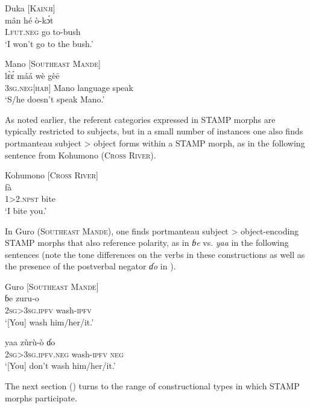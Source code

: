 \documentclass[output=paper]{langsci/langscibook}
\begin{document}
\ea\label{ex:anderson:6}
Duka  \citep[13]{BendorSamuelEtAl1973}      [\textsc{Kainji}]\\
\gll mân  hé  ò-k\'ɔt  \\
\textsc{I.fut.neg}  go  to-bush\\
\glt `I won't go to the bush.'      
\z

\ea\label{ex:anderson:7}
Mano \citep[226]{Vydrine2009}           [\textsc{Southeast Mande}]\\
\gll l\`{ɛ}\'{ɛ}      máá    wè    gè\={e}\\
\textsc{3sg.neg[hab]}  Mano    language  speak\\
\glt `S/he doesn't speak Mano.'
\z

As noted earlier, the referent categories expressed in STAMP morphs are typically restricted to subjects, but in a small number of instances one also finds portmanteau subject > object forms within a STAMP morph, as in the following sentence from Kohumono (\textsc{Cross River}).

\ea\label{ex:anderson:8}
 Kohumono \citep[355]{Cook1972}         [\textsc{Cross River}]\\
    fà\\
1>2.\textsc{npst}  bite\\
\glt `I bite you.'
\z

In Guro (\textsc{Southeast Mande}), one finds portmanteau subject > object-encoding STAMP morphs that also reference polarity, as in \textit{ɓ}\textit{e} vs. \textit{yaa} in the following sentences (note the tone differences on the verbs in these constructions as well as the presence of the postverbal negator \textit{ɗo} in ). 

\ea\label{ex:anderson:9}
\ea\label{ex:anderson:9a}
Guro \citep[239]{Vydrine2009}       [\textsc{Southeast} \textsc{Mande}]\\
\gll  ɓe      zuru-o      \\
  \textsc{2sg>3sg.ipfv}    wash-\textsc{ipfv} \\
\glt `[You] wash him/her/it.'       

\ex \label{ex:anderson:9b}
\gll  yaa      zùrù-ò    ɗo\\
  \textsc{2sg>3sg.ipfv.neg}  wash-\textsc{ipfv}  \textsc{neg}\\
\glt `[You] don't wash him/her/it.'
\z
\z

The next section () turns to the range of constructional types in which STAMP morphs participate.
\end{document}
